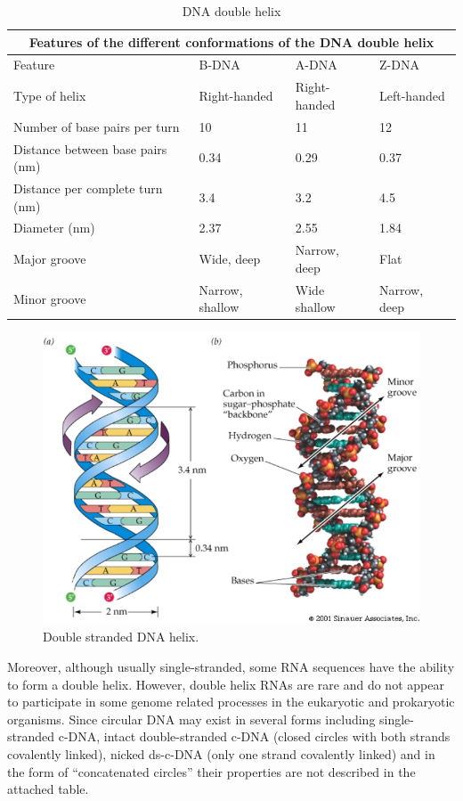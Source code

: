 \begin{table}[!ht]
	\caption{DNA double helix}\label{t:1}
	\smallskip
	\centering
	
	\begin{tabular}{ |p{3cm}||p{3cm}|p{3cm}|p{3cm}|  }
		\hline
		\multicolumn{4}{|c|}{Features of the different conformations of the DNA double helix} \\
		\hline
		Feature& B-DNA & A-DNA & Z-DNA\\
		\hline
		\hline
		Type of helix & Right-handed & Right-handed & Left-handed\\
		\hline
		Number of base pairs per turn & 10 & 11 & 12\\
		\hline
		Distance between base pairs (nm) & 0.34 & 0.29 & 0.37\\
		\hline
		Distance per complete turn (nm) & 3.4 & 3.2 & 4.5\\
		\hline
		Diameter (nm) & 2.37 & 2.55 & 1.84\\
		\hline
		Major groove & Wide, deep & Narrow, deep & Flat\\
		\hline
		Minor groove & Narrow, shallow & Wide shallow & Narrow, deep\\
		\hline
	\end{tabular}
\end{table}

\begin{figure}[!ht]
	\centering
	\includegraphics[width=.8\textwidth]{figures/spatial.png}
	\caption{Double stranded DNA helix.\label{o:latex_friendly_zone}}
\end{figure}

Moreover, although usually single-stranded, some RNA sequences have the ability to form a double helix. 
However, double helix RNAs are rare and do not appear to participate in some genome related processes in the eukaryotic and prokaryotic organisms.
Since circular DNA may exist in several forms including single-stranded c-DNA, intact double-stranded c-DNA (closed circles with both strands covalently linked), 
nicked ds-c-DNA (only one strand covalently linked) and in the form of “concatenated circles” their properties are not described in the attached table.

